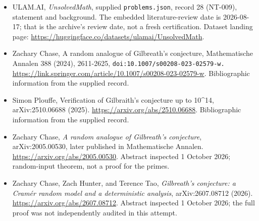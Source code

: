 \documentclass[11pt,a4paper]{article}
\begin{document}
{\small

\begin{itemize}

\item[\hypertarget{source:28:1}{S1}] ULAM.AI, \emph{UnsolvedMath}, supplied \texttt{problems.json}, record 28 (NT-009), statement and background. The embedded literature-review date is 2026-08-17; that is the archive’s review date, not a fresh certification. Dataset landing page: \url{https://huggingface.co/datasets/ulamai/UnsolvedMath}.

\item[\hypertarget{source:28:2}{S2}] Zachary Chase, A random analogue of Gilbreath's conjecture, Mathematische Annalen 388 (2024), 2611-2625, \nolinkurl{doi:10.1007/s00208-023-02579-w.} \url{https://link.springer.com/article/10.1007/s00208-023-02579-w}. Bibliographic information from the supplied record.

\item[\hypertarget{source:28:3}{S3}] Simon Plouffe, Verification of Gilbraith's conjecture up to 10\textasciicircum{}14, arXiv:2510.06688 (2025). \url{https://arxiv.org/abs/2510.06688}. Bibliographic information from the supplied record.


\item[E1] Zachary Chase, \emph{A random analogue of Gilbreath's
conjecture}, arXiv:2005.00530, later published in Mathematische Annalen.
\url{https://arxiv.org/abs/2005.00530}. Abstract inspected 1 October 2026;
random-input theorem, not a proof for the primes.
\item[E2] Zachary Chase, Zach Hunter, and Terence Tao,
\emph{Gilbreath's conjecture: a Cram\'er random model and a deterministic
analysis}, arXiv:2607.08712 (2026).
\url{https://arxiv.org/abs/2607.08712}. Abstract inspected 1 October 2026;
the full proof was not independently audited in this attempt.

\end{itemize}

}

\label{end:28}
\end{document}
